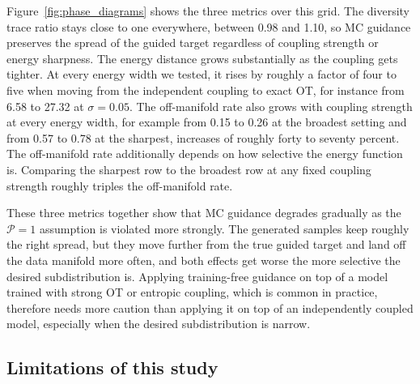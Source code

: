 \documentclass{article}
\begin{document}
Figure~\ref{fig:phase_diagrams} shows the three metrics over this grid.
The diversity trace ratio stays close to one everywhere, between 0.98 and 1.10, so MC guidance preserves the spread of the guided target regardless of coupling strength or energy sharpness.
The energy distance grows substantially as the coupling gets tighter.
At every energy width we tested, it rises by roughly a factor of four to five when moving from the independent coupling to exact OT, for instance from 6.58 to 27.32 at $\sigma=0.05$.
The off-manifold rate also grows with coupling strength at every energy width, for example from 0.15 to 0.26 at the broadest setting and from 0.57 to 0.78 at the sharpest, increases of roughly forty to seventy percent.
The off-manifold rate additionally depends on how selective the energy function is.
Comparing the sharpest row to the broadest row at any fixed coupling strength roughly triples the off-manifold rate.

These three metrics together show that MC guidance degrades gradually as the $\mathcal{P}=1$ assumption is violated more strongly.
The generated samples keep roughly the right spread, but they move further from the true guided target and land off the data manifold more often, and both effects get worse the more selective the desired subdistribution is.
Applying training-free guidance on top of a model trained with strong OT or entropic coupling, which is common in practice, therefore needs more caution than applying it on top of an independently coupled model, especially when the desired subdistribution is narrow.

\subsection{Limitations of this study}
\label{sec:study_limitations}
\end{document}
